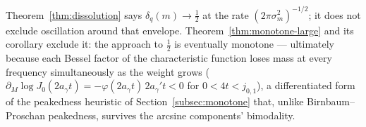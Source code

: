 \begin{remark}
Theorem~\ref{thm:dissolution} says $\delta_q(m)\to\tfrac12$ at the
rate $(2\pi\sigma_m^2)^{-1/2}$; it does not exclude oscillation
around that envelope. Theorem~\ref{thm:monotone-large} and its
corollary exclude it: the approach to $\tfrac12$ is eventually
monotone --- ultimately because each Bessel factor of the
characteristic function loses mass at every frequency
simultaneously as the weight grows
($\partial_M\log J_0(2a_\gamma t)=-\varphi(2a_\gamma t)\,
2a_\gamma't<0$ for $0<4t<j_{0,1}$), a differentiated form of the
peakedness heuristic of Section~\ref{subsec:monotone} that, unlike
Birnbaum--Proschan peakedness, survives the arcsine components'
bimodality.
\end{remark}

%
%
